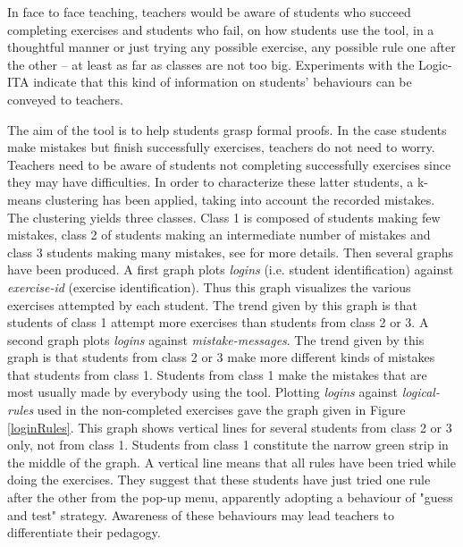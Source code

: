 In face to face teaching, teachers would be aware of students who succeed completing exercises and students who fail, on how students use the tool, in a thoughtful manner or just trying any possible exercise, any possible rule one after the other -- at least as far as classes are not too big.
Experiments with the Logic-ITA  indicate that this kind of information on students' behaviours can be conveyed to teachers.


The aim of the tool is to help students grasp formal proofs. In the
case students  make mistakes but finish successfully exercises,
teachers do not need to worry. Teachers need to be aware of students
not completing successfully exercises since they may have
difficulties. In order to characterize these latter students, a
 k-means clustering \cite{han} has been applied, taking
into account the recorded mistakes. The clustering  yields three
classes. Class 1 is composed of students making few mistakes, class 2
of students making an intermediate number of mistakes and class 3
students making many mistakes, see \cite{akwww04} for more details.
Then several graphs have been produced. A first graph plots {\em
logins} (i.e. student identification) against {\em exercise-id}
(exercise identification).  Thus this graph visualizes the various
exercises attempted by each student. The trend given by this graph is
that students of class 1  attempt more exercises than  students from
class 2 or 3. A second graph plots {\em logins} against {\em
mistake-messages}. The trend given by this graph is that students from
class 2 or 3 make more different kinds of mistakes that students from
class 1. Students from class 1 make the mistakes that are most usually
made by everybody using the tool.  Plotting {\em logins} against {\em
logical-rules} used in the non-completed exercises gave the graph
given in Figure \ref{loginRules}. This graph shows vertical lines for
several students from  class 2 or 3 only, not from class 1. Students
from class 1 constitute the narrow green strip in the middle of the
graph. A vertical line means that all rules have been tried while
doing the exercises.  They suggest that these students have just tried
one rule after the other from the pop-up menu, apparently adopting a
behaviour of "guess and test" strategy. Awareness of these behaviours
may lead teachers to differentiate their pedagogy. 

